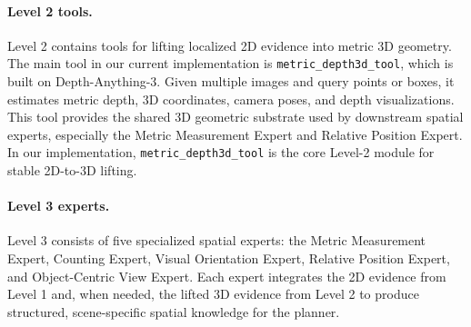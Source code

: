 \paragraph{Level 2 tools.}
Level 2 contains tools for lifting localized 2D evidence into metric 3D geometry. 
The main tool in our current implementation is \texttt{metric\_depth3d\_tool}, which is built on Depth-Anything-3. 
Given multiple images and query points or boxes, it estimates metric depth, 3D coordinates, camera poses, and depth visualizations. 
This tool provides the shared 3D geometric substrate used by downstream spatial experts, especially the Metric Measurement Expert and Relative Position Expert. 
In our implementation, \texttt{metric\_depth3d\_tool} is the core Level-2 module for stable 2D-to-3D lifting.

\paragraph{Level 3 experts.}
Level 3 consists of five specialized spatial experts: the Metric Measurement Expert, Counting Expert, Visual Orientation Expert, Relative Position Expert, and Object-Centric View Expert. 
Each expert integrates the 2D evidence from Level 1 and, when needed, the lifted 3D evidence from Level 2 to produce structured, scene-specific spatial knowledge for the planner.

